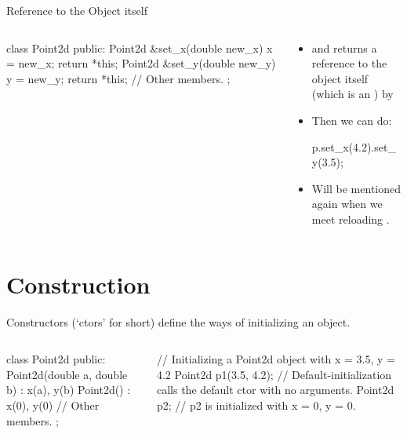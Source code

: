 \documentclass{beamer}
\begin{document}
\begin{frame}[fragile]{Reference to the Object itself}
    \begin{columns}
        \begin{column}{0.5\linewidth}
            \begin{cpp}
class Point2d {
 public:
  Point2d &set_x(double new_x) {
    x = new_x;
    return *this;
  }
  Point2d &set_y(double new_y) {
    y = new_y;
    return *this;
  }
  // Other members.
};
            \end{cpp}        
        \end{column}
        \begin{column}{0.5\linewidth}
            \begin{itemize}
                \item {} and  returns a reference to the object itself (which is an ) by 
                \item Then we can do:
                \begin{cpp}
p.set_x(4.2).set_y(3.5);
                \end{cpp}
                \item Will be mentioned again when we meet reloading .
            \end{itemize}
        \end{column}
    \end{columns}
\end{frame}

\section{Construction}

\begin{frame}[fragile]{Constructors}
     (`ctors' for short) define the ways of initializing an object.
    \begin{columns}
        \begin{column}{0.5\linewidth}
            \begin{cpp}
class Point2d {
 public:
  Point2d(double a, double b)
    : x(a), y(b) {}
  Point2d() : x(0), y(0) {}
  // Other members.
};
            \end{cpp}
        \end{column}
        \begin{column}{0.5\linewidth}
            \begin{cpp}
// Initializing a Point2d object with x = 3.5, y = 4.2
Point2d p1(3.5, 4.2);
// Default-initialization calls the default ctor with no arguments.
Point2d p2;
// p2 is initialized with x = 0, y = 0.
            \end{cpp}
        \end{column}
    \end{columns}
\end{frame}
\end{document}
